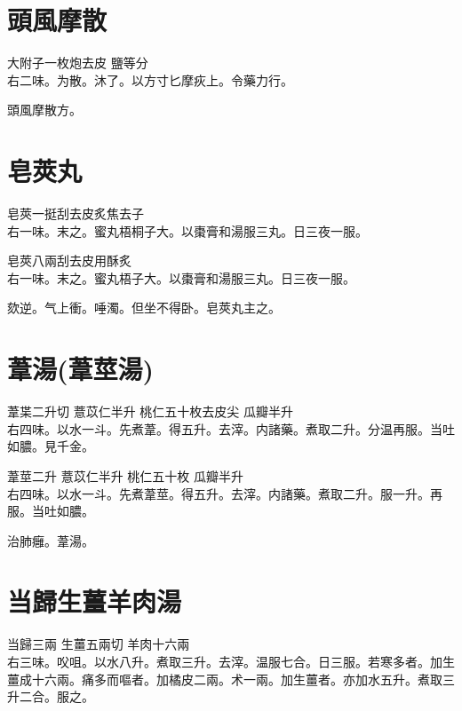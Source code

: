 \section{頭風摩散}

大附子{\scriptsize 一枚炮去皮} 鹽{\scriptsize 等分}\\
右二味。为散。沐了。以方寸匕摩疢上。令藥力行。

頭風摩散方。

\section{皂莢丸}

皂莢{\scriptsize 一挺刮去皮炙焦去子}\\
右一味。末之。蜜丸梧桐子大。以棗膏和湯服三丸。日三夜一服。{\wuben}

皂莢{\scriptsize 八兩刮去皮用酥炙}\\
右一味。末之。蜜丸梧子大。以棗膏和湯服三丸。日三夜一服。{\dengben}

欬逆。气上衝。唾濁。但坐不得卧。皂莢丸主之。

\section{葦湯(葦莖湯)}

葦枼{\scriptsize 二升切} 薏苡仁{\scriptsize 半升} 桃仁{\scriptsize 五十枚去皮尖} 瓜瓣{\scriptsize 半升}\\
右四味。以水一斗。先煮葦。得五升。去滓。内諸藥。煮取二升。分温再服。当吐如膿。{\scriptsize 見千金。}{\wuben}

葦莖{\scriptsize 二升} 薏苡仁{\scriptsize 半升} 桃仁{\scriptsize 五十枚} 瓜瓣{\scriptsize 半升}\\
右四味。以水一斗。先煮葦莖。得五升。去滓。内諸藥。煮取二升。服一升。再服。当吐如膿。{\dengben}

治肺癰。葦湯。


\section{当歸生薑羊肉湯}

当歸{\scriptsize 三兩} 生薑{\scriptsize 五兩切} 羊肉{\scriptsize 十六兩}\\
右三味。㕮咀。以水八升。煮取三升。去滓。温服七合。日三服。若寒多者。加生薑成十六兩。痛多而嘔者。加橘皮二兩。术一兩。加生薑者。亦加水五升。煮取三升二合。服之。

